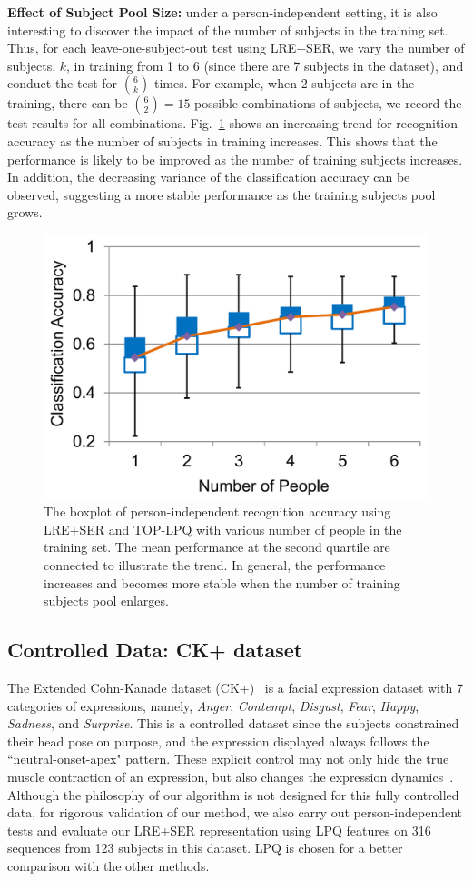 \documentclass[journal]{IEEEtran}
\begin{document}
\textbf{Effect of Subject Pool Size:} under a person-independent setting, it is also interesting to discover the impact of the number of subjects in the training set. Thus, for each leave-one-subject-out test using LRE+SER, we vary the number of subjects, $k$, in training from 1 to 6 (since there are 7 subjects in the dataset), and conduct the test for ${6 \choose k}$ times. For example, when 2 subjects are in the training, there can be ${6 \choose 2}=15$ possible combinations of subjects, we record the test results for all combinations. Fig.~\ref{fig:effect_people_num} shows an increasing trend for recognition accuracy as the number of subjects in training increases. This shows that the performance is likely to be improved as the number of training subjects increases. In addition, the decreasing variance of the classification accuracy can be observed, suggesting a more stable performance as the training subjects pool grows. 


\begin{figure}[htbp]
	\centering
		\includegraphics[width=.65\columnwidth]{pics/effect_people_num.png}
	\caption{The boxplot of person-independent recognition accuracy using LRE+SER and TOP-LPQ with various number of people in the training set. The mean performance at the second quartile are connected to illustrate the trend. In general, the performance increases and becomes more stable when the number of training subjects pool enlarges.}
	\label{fig:effect_people_num}
\end{figure}


\subsection{Controlled Data: CK+ dataset}

The Extended Cohn-Kanade dataset (CK+)~\cite{CKplus} is a facial expression dataset with 7 categories of expressions, namely, \textit{Anger}, \textit{Contempt}, \textit{Disgust}, \textit{Fear}, \textit{Happy}, \textit{Sadness}, and \textit{Surprise}. This is a controlled dataset since the subjects constrained their head pose on purpose, and the expression displayed always follows the ``neutral-onset-apex" pattern. These explicit control may not only hide the true muscle contraction of an expression, but also changes the expression dynamics~\cite{Bartlett03,Ekman2005}. Although the philosophy of our algorithm is not designed for this fully controlled data, for rigorous validation of our method, we also carry out person-independent tests and evaluate our LRE+SER representation using LPQ features on 316 sequences from 123 subjects in this dataset. LPQ is chosen for a better comparison with the other methods. 
\end{document}
